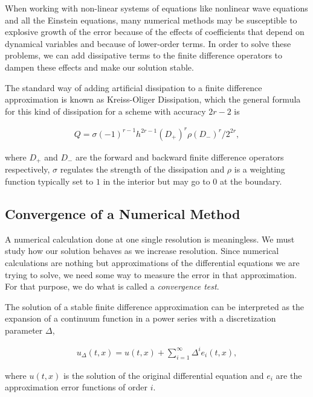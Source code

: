 When working with non-linear systems of equations like nonlinear wave equations and all the Einstein equations, many numerical methods may be susceptible to explosive growth of the error because of the effects of coefficients that depend on dynamical variables and because of lower-order terms. In order to solve these problems, we can add dissipative terms to the finite difference operators to dampen these effects and make our solution stable. \cite{book}

The standard way of adding artificial dissipation to a finite difference approximation is known as Kreiss-Oliger Dissipation, which the general formula for this kind of dissipation for a scheme with accuracy $2r-2$ is 

\begin{align}
    Q = \sigma (-1)^{r-1} h^{2r-1}(D_+)^r \rho (D_-)^r /2^{2r},
    \label{eq:dissipation_general}
\end{align}

\noindent
where $D_+$ and $D_-$ are the forward and backward finite difference operators respectively,  $\sigma$ regulates the strength of the dissipation and $\rho$ is a weighting function typically set to $1$ in the interior but may go to $0$ at the boundary.\cite{article}


\subsection{Convergence of a Numerical Method}
A numerical calculation done at one single resolution is meaningless. We must study how our solution behaves as we increase resolution. Since numerical calculations are nothing but approximations of the differential equations we are trying to solve, we need some way to measure the error in that approximation. For that purpose, we do what is called a \textit{convergence test}.

The solution of a stable finite difference approximation can be interpreted as the expansion of a continuum function in a power series with a discretization parameter $\Delta$, 

\begin{align}
    u_\Delta (t,x) = u(t,x) + \sum_{i=1}^{\infty} \Delta^i e_i (t,x),
    \label{eq:discrete_error}
\end{align}

\noindent
where $u(t,x)$ is the solution of the original differential equation and $e_i$ are the approximation error functions of order $i$. \cite{book}




